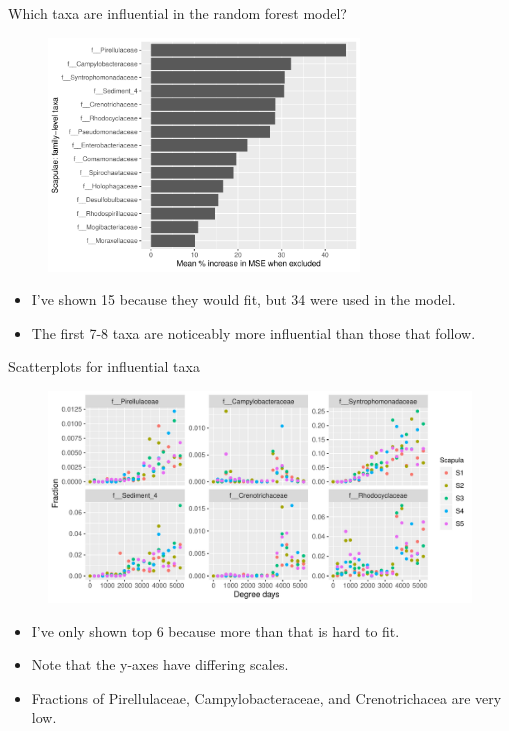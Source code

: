 \documentclass{beamer}
\begin{document}
\begin{frame}{Which taxa are influential in the random forest model?}

  \begin{center}
    \begin{figure}
      \includegraphics[width=3.25in]{use_families/w_scapulae/families_scapula_PercIncMSE_barchart}
    \end{figure}
  \end{center}
  \vspace{-0.1in}
  {\scriptsize
  \begin{itemize}
  \item I've shown 15 because they would fit, but 34 were used in the model.
  \item The first 7-8 taxa are noticeably more influential than those that
  follow.
  \end{itemize}
  }

\end{frame}



\begin{frame}{Scatterplots for influential taxa}

  \begin{center}
    \begin{figure}
      \includegraphics[width=4.75in]{use_families/w_scapulae/infl_scapula_family_scatter}
    \end{figure}
  \end{center}
  \vspace{-0.25in}
  {\scriptsize
  \begin{itemize}
  \item I've only shown top 6 because more than that is hard to fit.
  \item Note that the y-axes have differing scales.
  \item Fractions of Pirellulaceae, Campylobacteraceae, and Crenotrichacea
  are very low.
  \end{itemize}
  }

\end{frame}
\end{document}
